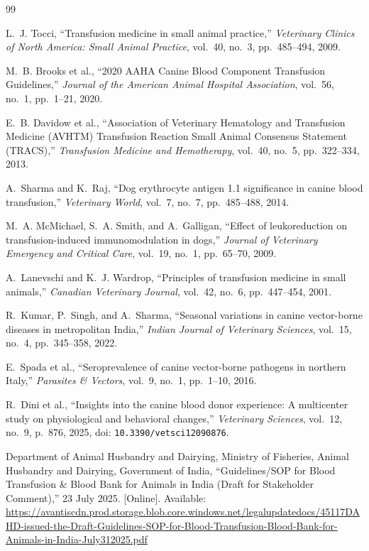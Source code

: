 \documentclass[12pt,a4paper]{article}
\begin{document}
\begin{thebibliography}{99}

L.~J. Tocci,
``Transfusion medicine in small animal practice,''
\textit{Veterinary Clinics of North America: Small Animal Practice},
vol.~40, no.~3, pp.~485--494, 2009.

M.~B. Brooks et al.,
``2020 AAHA Canine Blood Component Transfusion Guidelines,''
\textit{Journal of the American Animal Hospital Association},
vol.~56, no.~1, pp.~1--21, 2020.

E.~B. Davidow et al.,
``Association of Veterinary Hematology and Transfusion Medicine (AVHTM)
Transfusion Reaction Small Animal Consensus Statement (TRACS),''
\textit{Transfusion Medicine and Hemotherapy},
vol.~40, no.~5, pp.~322--334, 2013.

A.~Sharma and K.~Raj,
``Dog erythrocyte antigen 1.1 significance in canine blood transfusion,''
\textit{Veterinary World},
vol.~7, no.~7, pp.~485--488, 2014.

M.~A. McMichael, S.~A. Smith, and A.~Galligan,
``Effect of leukoreduction on transfusion-induced immunomodulation in dogs,''
\textit{Journal of Veterinary Emergency and Critical Care},
vol.~19, no.~1, pp.~65--70, 2009.

A.~Lanevschi and K.~J. Wardrop,
``Principles of transfusion medicine in small animals,''
\textit{Canadian Veterinary Journal},
vol.~42, no.~6, pp.~447--454, 2001.

R.~Kumar, P.~Singh, and A.~Sharma,
``Seasonal variations in canine vector-borne diseases in metropolitan India,''
\textit{Indian Journal of Veterinary Sciences},
vol.~15, no.~4, pp.~345--358, 2022.

E.~Spada et al.,
``Seroprevalence of canine vector-borne pathogens in northern Italy,''
\textit{Parasites \& Vectors},
vol.~9, no.~1, pp.~1--10, 2016.

R.~Dini et al.,
``Insights into the canine blood donor experience: A multicenter study
on physiological and behavioral changes,''
\textit{Veterinary Sciences},
vol.~12, no.~9, p.~876, 2025,
doi: \texttt{10.3390/vetsci12090876}.

Department of Animal Husbandry and Dairying, Ministry of Fisheries, Animal
Husbandry and Dairying, Government of India,
``Guidelines/SOP for Blood Transfusion \& Blood Bank for Animals in India
(Draft for Stakeholder Comment),''
23 July 2025. [Online]. Available:
\url{https://avantiscdn.prod.storage.blob.core.windows.net/legalupdatedocs/45117DAHD-issued-the-Draft-Guidelines-SOP-for-Blood-Transfusion-Blood-Bank-for-Animals-in-India-July312025.pdf}


\end{thebibliography}
\end{document}
